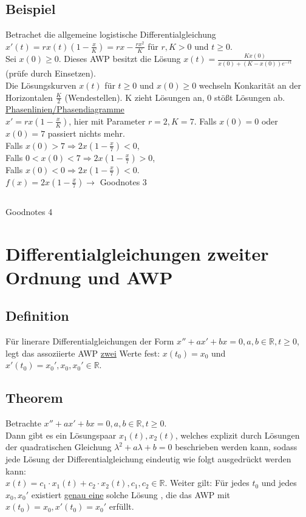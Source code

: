 \documentclass[12pt,a4paper]{article}
\newcommand{\DGL}{Differentialgleichung }
\newcommand{\DGLs}{Differentialgleichungen }
\newcommand{\Lsg}{Lösung }
\newcommand{\LSG}{Lösungen }
\begin{document}
\subsection{Beispiel}
Betrachet die allgemeine logistische \DGL $x'(t) = rx(t)(1-\frac{x}{K}) = rx-\frac{rx^2}{K}$ für $r,K > 0$ und $t \geq 0$. \\
Sei $x(0) \geq 0$. Dieses AWP besitzt die \Lsg $x(t) = \frac{Kx(0)}{x(0)+(K-x(0))e^{-rt}}$ (prüfe durch Einsetzen). \\
Die Lösungskurven $x(t)$ für $t \geq 0$ und $x(0) \geq 0$ wechseln Konkarität an der Horizontalen $\frac{K}{2}$ (Wendestellen). K zieht Lösungen an, 0 stößt Lösungen ab. \\
\underline{Phasenlinien/Phasendiagramme} \\
$x'=rx(1-\frac{x}{K})$, hier mit Parameter $r=2, K=7$. Falls $x(0) = 0$ oder $x(0) = 7$ passiert nichts mehr. \\
Falls $x(0) > 7 \Rightarrow 2x(1-\frac{x}{7}) < 0$, \\
Falls $0 < x(0) < 7 \Rightarrow 2x(1-\frac{x}{7}) > 0$, \\
Falls $x(0) < 0 \Rightarrow 2x(1-\frac{x}{7}) < 0$. \\
$f(x) = 2x(1-\frac{x}{7}) \rightarrow$ Goodnotes 3
\subsection{}
Goodnotes 4
\section{\DGLs zweiter Ordnung und AWP}
\subsection{Definition}
Für linerare \DGLs der Form $x'' + ax' + bx = 0, a,b \in \mathbb{R}, t \geq 0$, legt das assoziierte AWP \underline{zwei} Werte fest: $x(t_0) = x_0$ und $x'(t_0) = x_0', x_0, x_0' \in \mathbb{R}$.
\subsection{Theorem}
Betrachte $x'' + ax' + bx = 0, a,b \in \mathbb{R}, t \geq 0$. \\
Dann gibt es ein Lösungspaar $x_1(t), x_2(t)$, welches explizit durch \LSG der quadratischen Gleichung $\lambda^2+a\lambda+b=0$ beschrieben werden kann, sodass jede \Lsg der \DGL eindeutig wie folgt ausgedrückt werden kann: \\
$x(t) = c_1 \cdot x_1(t) + c_2 \cdot x_2(t), c_1, c_2 \in \mathbb{R}$. Weiter gilt: Für jedes $t_0$ und jedes $x_0, x_0'$ existiert \underline{genau eine} solche \Lsg, die das AWP mit $x(t_0) = x_0, x'(t_0) = x_0'$ erfüllt.
\end{document}
